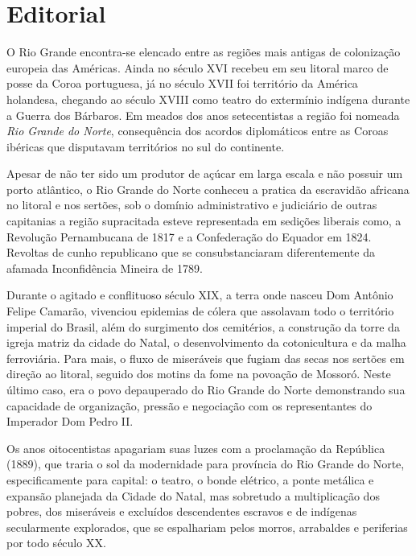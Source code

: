 \chapter{Editorial}

O Rio Grande encontra-se elencado entre as regiões mais antigas de colonização europeia das Américas. Ainda no século XVI recebeu em seu litoral marco de posse da Coroa portuguesa, já no século XVII foi território da América holandesa, chegando ao século XVIII como teatro do extermínio indígena durante a Guerra dos Bárbaros. Em meados dos anos setecentistas a região foi nomeada \textit{Rio Grande do Norte}, consequência dos acordos diplomáticos entre as Coroas ibéricas que disputavam territórios no sul do continente. 

Apesar de não ter sido um produtor de açúcar em larga escala e não possuir um porto atlântico, o Rio Grande do Norte conheceu a pratica da escravidão africana no litoral e nos sertões, sob o domínio administrativo e judiciário de outras capitanias a região supracitada esteve representada em sedições liberais como, a Revolução Pernambucana de 1817 e a Confederação do Equador em 1824. Revoltas de cunho republicano que se consubstanciaram diferentemente da afamada Inconfidência Mineira de 1789.  

Durante o agitado e conflituoso século XIX, a terra onde nasceu Dom Antônio Felipe Camarão, vivenciou epidemias de cólera que assolavam todo o território imperial do Brasil, além do surgimento dos cemitérios, a construção da torre da igreja matriz da cidade do Natal, o desenvolvimento da cotonicultura e da malha ferroviária. Para mais, o fluxo de miseráveis que fugiam das secas nos sertões em direção ao litoral, seguido dos motins da fome na povoação de Mossoró. Neste último caso, era o povo depauperado do Rio Grande do Norte demonstrando sua capacidade de organização, pressão e negociação com os representantes do Imperador Dom Pedro II. 

Os anos oitocentistas apagariam suas luzes com a proclamação da República (1889), que traria o sol da modernidade para província do Rio Grande do Norte, especificamente para capital: o teatro, o bonde elétrico, a ponte metálica e expansão planejada da Cidade do Natal, mas sobretudo a multiplicação dos pobres, dos miseráveis e excluídos descendentes escravos e de indígenas secularmente explorados, que se espalhariam pelos morros, arrabaldes e periferias por todo século XX. 

